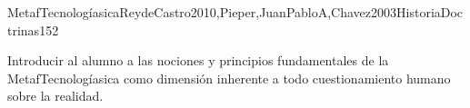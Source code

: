 \begin{syllabus}
\begin{unit}{MetafTecnologíasica}{ReydeCastro2010,Pieper,JuanPabloA,Chavez2003HistoriaDoctrinas}{15}{2}
\begin{unitgoals}
	\item Introducir al alumno a las nociones y principios fundamentales de la MetafTecnologíasica como dimensión inherente a todo cuestionamiento humano sobre la realidad.
\end{unitgoals}
\end{unit}



\begin{coursebibliography}
\end{coursebibliography}

\end{syllabus}
